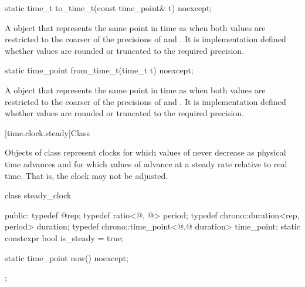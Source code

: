 %
\begin{itemdecl}
static time_t to_time_t(const time_point& t) noexcept;
\end{itemdecl}

\begin{itemdescr}
\pnum
\returns A  object that represents the same point in time as 
when both values are restricted to the coarser of the precisions of  and
.
It is implementation defined whether values are rounded or truncated to the
required precision.
\end{itemdescr}

%
\begin{itemdecl}
static time_point from_time_t(time_t t) noexcept;
\end{itemdecl}

\begin{itemdescr}
\pnum
\returns A  object that represents the same point in time as 
when both values are restricted to the coarser of the precisions of  and
.
It is implementation defined whether values are rounded or truncated to the
required precision.
\end{itemdescr}

[time.clock.steady]{Class }

\pnum
Objects of class  represent clocks for which values of 
never decrease as physical time advances and for which values of  advance at
a steady rate relative to real time. That is, the clock may not be adjusted.

\begin{codeblock}
class steady_clock {
public:
  typedef @\unspec@                               rep;
  typedef ratio<@\unspec@, @\unspec@>          period;
  typedef chrono::duration<rep, period>              duration;
  typedef chrono::time_point<@\unspec,@ duration>  time_point;
  static constexpr bool is_steady =               true;

  static time_point now() noexcept;
};
\end{codeblock}

